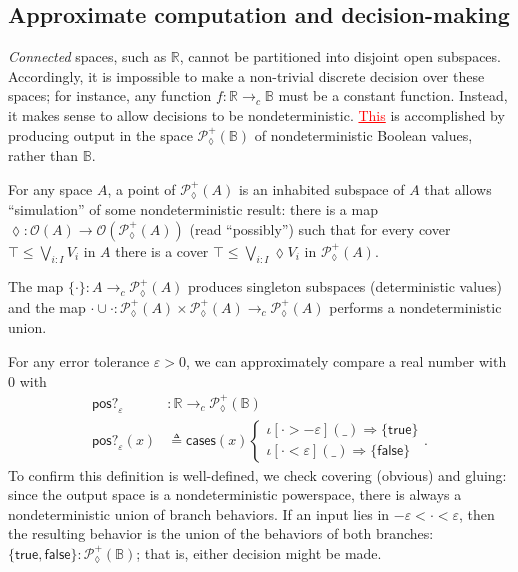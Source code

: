 \documentclass[conference]{IEEEtran}
\newcommand{\PLower}{\mathcal{P}_\lozenge}
\newcommand{\cto}{\to_c}
\newcommand{\R}{\mathbb{R}}
\newcommand{\Open}[1]{\mathcal{O}({#1})}
\newcommand{\bool}{\mathbb{B}}
\newcommand{\wildcard}{\_}
\newcommand{\oinclf}[1]{\iota[{#1}]}
\newcommand{\oincl}[2]{\oinclf{#1} \left({#2}\right)}
\newcommand{\Branch}{\Rightarrow}
\newcommand{\grammar}[1]{\textcolor{red}{\underline{#1}}}
\begin{document}
\subsection{Approximate computation and decision-making}
\label{s:ex:approx}

\emph{Connected} spaces, such as $\R$, cannot be partitioned into disjoint open subspaces. Accordingly, it is impossible to make a non-trivial discrete decision over these spaces; for instance, any function $f : \R \cto \bool$ must be a constant function. Instead, it makes sense to allow decisions to be nondeterministic. \grammar{This} is accomplished by producing output in the space $\PLower^+(\bool)$ of nondeterministic Boolean values, rather than $\bool$.

For any space $A$, a point of $\PLower^+(A)$ is an inhabited subspace of $A$ that allows ``simulation'' of some nondeterministic result: there is a map $\lozenge : \Open{A} \to \Open{\PLower^+(A)}$ (read ``possibly'') such that for every cover $\top \le \bigvee_{i : I} V_i$ in $A$ there is a cover $\top \le \bigvee_{i : I} \lozenge V_i$ in $\PLower^+(A)$. 

The map $\{ \cdot \} : A \cto \PLower^+(A)$ produces singleton subspaces (deterministic values) and the map $\cdot \cup \cdot : \PLower^+(A) \times \PLower^+(A) \cto \PLower^+(A)$ performs a nondeterministic union.

For any error tolerance $\varepsilon > 0$, we can approximately compare a real number with 0 with
\begin{align*}
\mathsf{pos?}_\varepsilon &: \R \cto \PLower^+(\bool)
\\ \mathsf{pos?}_\varepsilon(x) &\triangleq \mathsf{cases}(x)
\begin{cases}
\oincl{\cdot > - \varepsilon}{\wildcard} \Branch \{ \mathsf{true} \}
\\ \oincl{\cdot < \varepsilon}{\wildcard} \Branch \{ \mathsf{false} \}
\end{cases}.
\end{align*}
To confirm this definition is well-defined, we check covering (obvious) and gluing: since the output space is a nondeterministic powerspace, there is always a nondeterministic union of branch behaviors. If an input lies in $- \varepsilon < \cdot < \varepsilon$, then the resulting behavior is the union of the behaviors of both branches: $\{ \mathsf{true}, \mathsf{false} \} : \PLower^+(\bool)$; that is, either decision might be made.
\end{document}
